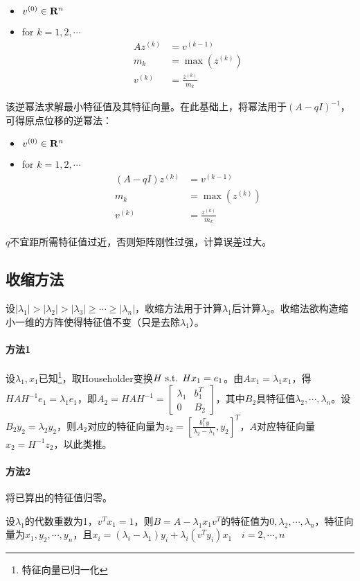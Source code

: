 \documentclass{ctexart}
\begin{document}
\begin{itemize}
\item $v^{(0)}\in\mathbf{R}^n$
\item for $k=1,2,\cdots$
\begin{align*}
Az^{(k)}&=v^{(k-1)}\\
m_k&=\max(z^{(k)})\\
v^{(k)}&=\frac{z^{(k)}}{m_k}
\end{align*}
\end{itemize}
该逆幂法求解最小特征值及其特征向量。在此基础上，将幂法用于$(A-qI)^{-1}$，可得原点位移的逆幂法：
\begin{itemize}
\item $v^{(0)}\in\mathbf{R}^n$
\item for $k=1,2,\cdots$
\begin{align*}
(A-qI)z^{(k)}&=v^{(k-1)}\\
m_k&=\max(z^{(k)})\\
v^{(k)}&=\frac{z^{(k)}}{m_k}
\end{align*}
\end{itemize}

$q$不宜距所需特征值过近，否则矩阵刚性过强，计算误差过大。

\subsection{收缩方法}
设$|\lambda_1|>|\lambda_2|>|\lambda_3|\geq\cdots\geq|\lambda_n|$，收缩方法用于计算$\lambda_1$后计算$\lambda_2$。收缩法欲构造缩小一维的方阵使得特征值不变（只是去除$\lambda_1$）。

\paragraph{方法1} 设$\lambda_1,x_1$已知\footnote{特征向量已归一化}，取Householder变换$H\text{ s.t. } Hx_1=e_1$。由$Ax_1=\lambda_1x_1$，得$HAH^{-1}e_1=\lambda_1e_1$，即$A_2=HAH^{-1}=\begin{bmatrix}\lambda_1&b_1^T\\0&B_2\end{bmatrix}$，其中$B_2$具特征值$\lambda_2,\cdots,\lambda_n$。设$B_2y_2=\lambda_2y_2$，则$A_2$对应的特征向量为$z_2=[\frac{b_1^Ty}{\lambda_2-\lambda_1},y_2]^T$，$A$对应特征向量$x_2=H^{-1}z_2$，以此类推。

\paragraph{方法2} 将已算出的特征值归零。
\begin{Thm}
设$\lambda_1$的代数重数为1，$v^Tx_1=1$，则$B=A-\lambda_1x_1v^T$的特征值为$0,\lambda_2,\cdots,\lambda_n$，特征向量为$x_1,y_2,\cdots,y_n$，且$x_i=(\lambda_i-\lambda_1)y_i+\lambda_i(v^Ty_i)x_1\quad i=2,\cdots,n$
\end{Thm}
\end{document}
